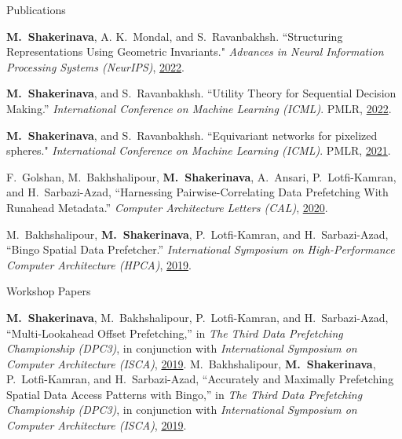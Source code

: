 \documentclass{resume}
\newcommand{\InternalSpace}{\vspace{0.18cm}}
\newenvironment{MySection}[1]
{\begin{category}{#1}}
{\end{category}}
\newcommand{\MyItem}{\citembullet}
\begin{document}
\begin{MySection}{Publications}

\MyItem \textbf{M.~Shakerinava}, A. K.~Mondal, and S.~Ravanbakhsh. {``Structuring Representations Using Geometric Invariants."} \textit{Advances in Neural Information Processing Systems (NeurIPS)}, \href{https://papers.nips.cc/paper_files/paper/2022/hash/dcd297696d0bb304ba426b3c5a679c37-Abstract-Conference.html}{2022}.

\MyItem \textbf{M.~Shakerinava}, and S.~Ravanbakhsh. {``Utility Theory for Sequential Decision Making.''} \textit{International Conference on Machine Learning (ICML)}. PMLR, \href{https://proceedings.mlr.press/v162/shakerinava22a/shakerinava22a.pdf}{2022}.

\MyItem \textbf{M.~Shakerinava}, and S.~Ravanbakhsh. {``Equivariant networks for pixelized spheres."} \textit{International Conference on Machine Learning (ICML)}. PMLR, \href{http://proceedings.mlr.press/v139/shakerinava21a/shakerinava21a.pdf}{2021}.

\MyItem F.~Golshan, M.~Bakhshalipour, \textbf{M.~Shakerinava}, A.~Ansari, P.~Lotfi-Kamran, and H.~Sarbazi-Azad, {``Harnessing Pairwise-Correlating Data Prefetching With Runahead Metadata.''} \textit{Computer Architecture Letters (CAL)}, \href{https://ieeexplore.ieee.org/abstract/document/9177277}{2020}.

\MyItem M.~Bakhshalipour, \textbf{M.~Shakerinava}, P.~Lotfi-Kamran, and H.~Sarbazi-Azad, {``Bingo Spatial Data Prefetcher.''} \textit{International Symposium on High-Performance Computer Architecture (HPCA)}, \href{https://cs.ipm.ac.ir/~plotfi/papers/bingo_hpca19.pdf}{2019}.

\end{MySection}

\InternalSpace

\begin{MySection}{Workshop Papers}

\MyItem \textbf{M.~Shakerinava}, M.~Bakhshalipour, P.~Lotfi-Kamran, and H.~Sarbazi-Azad, {``Multi-Lookahead Offset Prefetching,''} in \textit{The Third Data Prefetching Championship (DPC3)}, in conjunction with \textit{International Symposium on Computer Architecture (ISCA)}, \href{https://dpc3.compas.cs.stonybrook.edu/pdfs/Multi_lookahead.pdf}{2019}.
\MyItem M.~Bakhshalipour, \textbf{M.~Shakerinava}, P.~Lotfi-Kamran, and H.~Sarbazi-Azad, {``Accurately and Maximally Prefetching Spatial Data Access Patterns with Bingo,''} in \textit{The Third Data Prefetching Championship (DPC3)}, in conjunction with \textit{International Symposium on Computer Architecture (ISCA)}, \href{https://dpc3.compas.cs.stonybrook.edu/pdfs/Accurately.pdf}{2019}.

\end{MySection}
\end{document}
